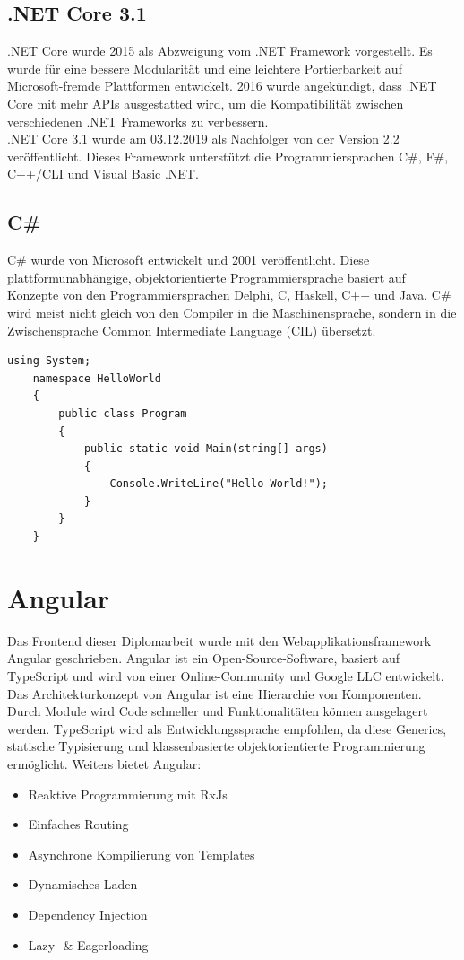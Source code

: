 \subsection{.NET Core 3.1}
.NET Core wurde 2015 als Abzweigung vom .NET Framework vorgestellt. Es wurde für eine bessere Modularität und eine leichtere Portierbarkeit auf Microsoft-fremde Plattformen entwickelt. 2016 wurde angekündigt, dass .NET Core mit mehr APIs ausgestatted wird, um die Kompatibilität zwischen verschiedenen .NET Frameworks zu verbessern. \autocite{wikiDotnet} \\
.NET Core 3.1 wurde am 03.12.2019 als Nachfolger von der Version 2.2 veröffentlicht. Dieses Framework unterstützt die Programmiersprachen C\#, F\#, C++/CLI und Visual Basic .NET. \autocite{wikiDotnetCore}

\subsection{C\#}
C\# wurde von Microsoft entwickelt und 2001 veröffentlicht. Diese plattformunabhängige, objektorientierte Programmiersprache basiert auf Konzepte von den Programmiersprachen Delphi, C, Haskell, C++ und Java.
C\# wird meist nicht gleich von den Compiler in die Maschinensprache, sondern in die Zwischensprache Common Intermediate Language (CIL) übersetzt. \autocite{wikiCSharp}

\begin{lstlisting}[caption={C\#-Syntaxbeispiel}, language={[Sharp]C}]
	using System;
	namespace HelloWorld
	{
		public class Program
		{
			public static void Main(string[] args)
			{
				Console.WriteLine("Hello World!");
			}
		}
	}
\end{lstlisting}
\section{Angular}
Das Frontend dieser Diplomarbeit wurde mit den Webapplikationsframework Angular geschrieben. Angular ist ein Open-Source-Software, basiert auf TypeScript und wird von einer Online-Community und Google LLC entwickelt.\\
Das Architekturkonzept von Angular ist eine Hierarchie von Komponenten. Durch Module wird Code schneller und Funktionalitäten können ausgelagert werden. TypeScript wird als Entwicklungssprache empfohlen, da diese Generics, statische Typisierung und klassenbasierte objektorientierte Programmierung ermöglicht. \autocite{wikiAngular}
Weiters bietet Angular:

\begin{itemize}
	\item Reaktive Programmierung mit RxJs
	\item Einfaches Routing
	\item Asynchrone Kompilierung von Templates
	\item Dynamisches Laden
	\item Dependency Injection
	\item Lazy- \& Eagerloading
\end{itemize}

